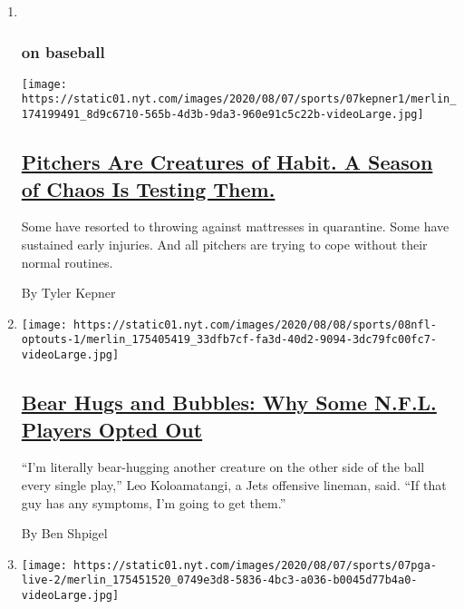 \begin{enumerate}
\def\labelenumi{\arabic{enumi}.}
\item ~
  \hypertarget{on-baseball}{%
  \subsubsection{on baseball}\label{on-baseball}}

  \texttt{[image: https://static01.nyt.com/images/2020/08/07/sports/07kepner1/merlin\_174199491\_8d9c6710-565b-4d3b-9da3-960e91c5c22b-videoLarge.jpg]}

  \hypertarget{pitchers-are-creatures-of-habit-a-season-of-chaos-is-testing-them}{%
  \subsection{\texorpdfstring{\href{/2020/08/08/sports/baseball/mlb-pitching-injuries.html}{Pitchers
  Are Creatures of Habit. A Season of Chaos Is Testing
  Them.}}{Pitchers Are Creatures of Habit. A Season of Chaos Is Testing Them.}}\label{pitchers-are-creatures-of-habit-a-season-of-chaos-is-testing-them}}

  Some have resorted to throwing against mattresses in quarantine. Some
  have sustained early injuries. And all pitchers are trying to cope
  without their normal routines.

  By Tyler Kepner
\item
  \texttt{[image: https://static01.nyt.com/images/2020/08/08/sports/08nfl-optouts-1/merlin\_175405419\_33dfb7cf-fa3d-40d2-9094-3dc79fc00fc7-videoLarge.jpg]}

  \hypertarget{bear-hugs-and-bubbles-why-some-nfl-players-opted-out}{%
  \subsection{\texorpdfstring{\href{/2020/08/08/sports/football/nfl-players-opt-out.html}{Bear
  Hugs and Bubbles: Why Some N.F.L. Players Opted
  Out}}{Bear Hugs and Bubbles: Why Some N.F.L. Players Opted Out}}\label{bear-hugs-and-bubbles-why-some-nfl-players-opted-out}}

  ``I'm literally bear-hugging another creature on the other side of the
  ball every single play,'' Leo Koloamatangi, a Jets offensive lineman,
  said. ``If that guy has any symptoms, I'm going to get them.''

  By Ben Shpigel
\item
  \texttt{[image: https://static01.nyt.com/images/2020/08/07/sports/07pga-live-2/merlin\_175451520\_0749e3d8-5836-4bc3-a036-b0045d77b4a0-videoLarge.jpg]}


\end{enumerate}

